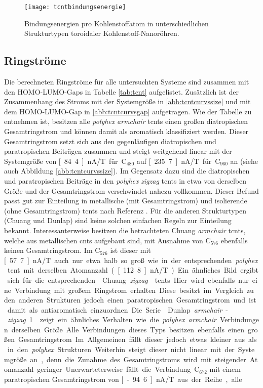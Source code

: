 \begin{figure}[ht!]
	\centering
	\texttt{[image: tcntbindungsenergie]}
	\captionsetup{figurewithin = chapter}
	\captionsetup{font=small, labelfont=bf}\caption[Bindungsenergien in toroidalen Kohlenstoff-Nanoröhren]{Bindungsenergien pro Kohlenstoffatom in unterschiedlichen Strukturtypen toroidaler Kohlenstoff-Nanoröhren.}
\label{abb:tcntbindungsenergie}
\end{figure}

\subsection{Ringströme}

Die berechneten Ringströme für alle untersuchten Systeme sind zusammen mit den HOMO-LUMO-Gaps in Tabelle \ref{tab:tcnt} aufgelistet. Zusätzlich ist der Zusammenhang des Stroms mit der Systemgröße in \ref{abb:tcntcurvssize} und mit dem HOMO-LUMO-Gap in \ref{abb:tcntcurvsgap} aufgetragen. Wie der Tabelle zu entnehmen ist, besitzen alle \textit{polyhex} \textit{armchair} \acp{tcnt} einen großen diatropischen Gesamtringstrom und können damit als aromatisch klassifiziert werden. Dieser Gesamtringstrom setzt sich aus den gegenläufigen diatropischen und paratropischen Beiträgen zusammen und steigt weitgehend linear mit der Systemgröße von \unit[84.4]{nA/T} für C$_{480}$ auf \unit[235.7]{nA/T} für C$_{960}$ an (siehe auch Abbildung \ref{abb:tcntcurvssize}). Im Gegensatz dazu sind die diatropischen und paratropischen Beiträge in den \textit{polyhex} \textit{zigzag} \acp{tcnt} in etwa von derselben Größe und der Gesamtringstrom verschwindet nahezu vollkommen. Dieser Befund passt gut zur Einteilung in metallische (mit Gesamtringstrom) und isolierende (ohne Gesamtringstrom) \acp{tcnt} nach Referenz \cite{zhang2005electronic}. Für die anderen Strukturtypen (Chuang und Dunlap) sind keine solchen einfachen Regeln zur Einteilung bekannt. Interessanterweise besitzen die betrachteten \glqq Chuang \textit{armchair}\grqq{} \acp{tcnt}, welche aus metallischen \acp{cnt} aufgebaut sind, mit Ausnahme von C$_{576}$ ebenfalls keinen Gesamtringstrom. Im C$_{576}$ ist dieser mit \unit[57.7]{nA/T} auch nur etwa halb so groß wie in der entsprechenden \textit{polyhex} \ac{tcnt} mit derselben Atomanzahl (\unit[112.8]{nA/T}). Ein ähnliches Bild ergibt sich für die entsprechenden \glqq Chuang \textit{zigzag}\grqq{} \acp{tcnt}. Hier wird ebenfalls nur eine Verbindung mit großem Ringstrom erhalten. Diese besitzt im Vergleich zu den anderen Strukturen jedoch einen paratropischen Gesamtringstrom und ist damit als antiaromatisch einzuordnen. Die Serie \glqq Dunlap \textit{armchair}-\textit{zigzag} 1\grqq{} zeigt ein ähnliches Verhalten wie die \textit{polyhex} \textit{armchair} Verbindungen derselben Größe. Alle Verbindungen dieses Typs besitzen ebenfalls einen großen Gesamtringstrom. Im Allgemeinen fällt dieser jedoch etwas kleiner aus als in den \textit{polyhex} Strukturen. Weiterhin steigt dieser nicht linear mit der Systemgröße an, denn die Zunahme des Gesamtringstroms wird mit steigender Atomanzahl geringer. Unerwarteterweise fällt die Verbindung C$_{672}$ mit einem paratropischen Gesamtringstrom von \unit[-94.6]{nA/T} aus der Reihe, alle 